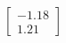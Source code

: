 \documentclass[preview]{standalone}
\begin{document}
\begin{align*}
\begin{bmatrix} -1.18 \\ 1.21 \end{bmatrix}
\end{align*}
\end{document}
